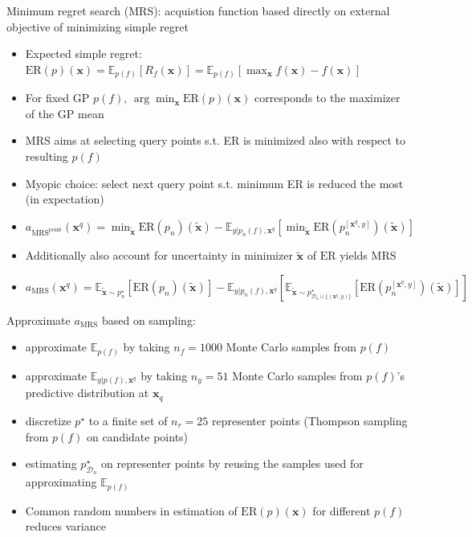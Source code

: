 \begin{block}{}

Minimum regret search (MRS): acquistion function based directly on external objective of minimizing simple regret
\begin{itemize}
 \item Expected simple regret: $\text{ER}(p)(\mathbf{x}) = \mathbb{E}_{p(f)}[R_f(\mathbf{x})]
= \mathbb{E}_{p(f)}[\max_{\mathbf{x}} f(\mathbf{x}) - f(\mathbf{
x})]$
 \item For fixed GP $p(f)$, $\arg\min_\mathbf{x} \text{ER}(p)(\mathbf{x})$ corresponds to the maximizer of the GP mean
 \item MRS aims at selecting query points s.t. ER is minimized also with respect to resulting $p(f)$
 \item Myopic choice: select next query point s.t. minimum ER is reduced the most (in expectation)
 \item $a_{\text{MRS}^{\text{point}}}(\mathbf{x}^q)
	= \min_{\mathbf{\tilde x}}\text{ER}(p_n)(\mathbf{\tilde x})
	 - \mathbb{E}_{y \vert p_n(f), \mathbf{x}^q}[\min_{\mathbf{\tilde x}}  \text{ER}(p^{[\mathbf{x}^q, y]}_n)(\mathbf{\tilde x})]$
 \item Additionally also account for uncertainty in minimizer $\mathbf{\tilde x}$ of $\text{ER}$ yields MRS
 \item $a_{\text{MRS}}(\mathbf{x}^q)
    = \mathbb{E}_{\mathbf{\tilde x} \sim p^\star_n}[\text{ER}(p_n)(\mathbf{\tilde x})] 
	   - \mathbb{E}_{y \vert p_n(f), \mathbf{x}^q}[
		  \mathbb{E}_{\mathbf{\tilde x} \sim p^\star_{\mathcal{D}_n \cup \{(\mathbf{x}^q, y)\}}}[
			 \text{ER}(p^{[\mathbf{x}^q, y]}_n)(\mathbf{\tilde x})]]$
\end{itemize}

Approximate $a_{\text{MRS}}$ based on sampling:
\begin{itemize}
 \item approximate $\mathbb{E}_{p(f)}$ by taking $n_f=1000$ Monte Carlo samples from $p(f)$
 \item approximate $\mathbb{E}_{y \vert p(f), \mathbf{x}^q}$  by taking
$n_y=51$ Monte Carlo samples from $p(f)$'s predictive distribution at
$\mathbf{x}_q$
 \item discretize $p^\star$ to a finite set of $n_r=25$ representer points (Thompson
sampling from $p(f)$ on candidate points)
 \item estimating $p^\star_{\mathcal{D}_n}$ on representer points by reusing the samples used 
for approximating $\mathbb{E}_{p(f)}$
\item Common random numbers in estimation of
$\text{ER}(p)(\mathbf{x})$ for different $p(f)$ reduces variance
\end{itemize}
\end{block}

